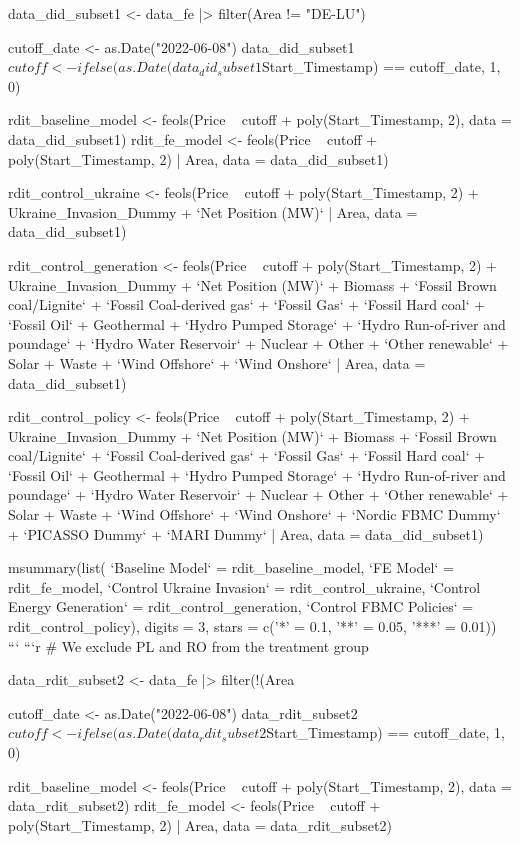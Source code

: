 data_did_subset1 <- data_fe |>
  filter(Area != "DE-LU")

cutoff_date <- as.Date("2022-06-08")
data_did_subset1$cutoff <- ifelse(as.Date(data_did_subset1$Start_Timestamp) == cutoff_date, 1, 0)

rdit_baseline_model <- feols(Price ~ cutoff + poly(Start_Timestamp, 2), data = data_did_subset1)
rdit_fe_model <- feols(Price ~ cutoff + poly(Start_Timestamp, 2) | Area, data = data_did_subset1)

rdit_control_ukraine <- feols(Price ~ cutoff + poly(Start_Timestamp, 2) + Ukraine_Invasion_Dummy + `Net Position (MW)` | Area, data = data_did_subset1)

rdit_control_generation <- feols(Price ~ cutoff + poly(Start_Timestamp, 2) + Ukraine_Invasion_Dummy + `Net Position (MW)` + Biomass + `Fossil Brown coal/Lignite` + `Fossil Coal-derived gas` + `Fossil Gas` + `Fossil Hard coal` + `Fossil Oil` + Geothermal + `Hydro Pumped Storage` + `Hydro Run-of-river and poundage` + `Hydro Water Reservoir` + Nuclear + Other + `Other renewable` + Solar + Waste + `Wind Offshore` + `Wind Onshore` | Area, data = data_did_subset1)

rdit_control_policy <- feols(Price ~ cutoff + poly(Start_Timestamp, 2) + Ukraine_Invasion_Dummy + `Net Position (MW)` + Biomass + `Fossil Brown coal/Lignite` + `Fossil Coal-derived gas` + `Fossil Gas` + `Fossil Hard coal` + `Fossil Oil` + Geothermal + `Hydro Pumped Storage` + `Hydro Run-of-river and poundage` + `Hydro Water Reservoir` + Nuclear + Other + `Other renewable` + Solar + Waste + `Wind Offshore` + `Wind Onshore` + `Nordic FBMC Dummy` + `PICASSO Dummy` + `MARI Dummy` | Area, data = data_did_subset1)

msummary(list(
    `Baseline Model` = rdit_baseline_model,
    `FE Model` = rdit_fe_model,
    `Control Ukraine Invasion` = rdit_control_ukraine,
    `Control Energy Generation` = rdit_control_generation,
    `Control FBMC Policies` = rdit_control_policy),
  digits = 3,
  stars = c('*' = 0.1, '**' = 0.05, '***' = 0.01))
```
```{r}
# We exclude PL and RO from the treatment group

data_rdit_subset2 <- data_fe |>
  filter(!(Area %

cutoff_date <- as.Date("2022-06-08")
data_rdit_subset2$cutoff <- ifelse(as.Date(data_rdit_subset2$Start_Timestamp) == cutoff_date, 1, 0)

rdit_baseline_model <- feols(Price ~ cutoff + poly(Start_Timestamp, 2), data = data_rdit_subset2)
rdit_fe_model <- feols(Price ~ cutoff + poly(Start_Timestamp, 2) | Area, data = data_rdit_subset2)

